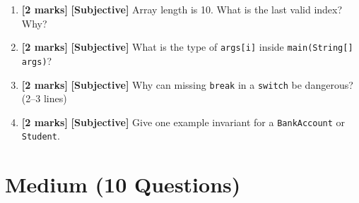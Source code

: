 \documentclass[11pt,a4paper]{article}
\newcommand{\EMarks}{\textbf{[2 marks]} }
\begin{document}
\begin{enumerate}[label=\textbf{E\arabic*.}, leftmargin=*]
  \item \EMarks \textbf{[Subjective]} Array length is 10. What is the last valid index? Why?

  \item \EMarks \textbf{[Subjective]} What is the type of \texttt{args[i]} inside \texttt{main(String[] args)}?

  \item \EMarks \textbf{[Subjective]} Why can missing \texttt{break} in a \texttt{switch} be dangerous? (2--3 lines)

  \item \EMarks \textbf{[Subjective]} Give one example invariant for a \texttt{BankAccount} or \texttt{Student}.
\end{enumerate}

\section*{Medium (10 Questions)}
\end{document}
